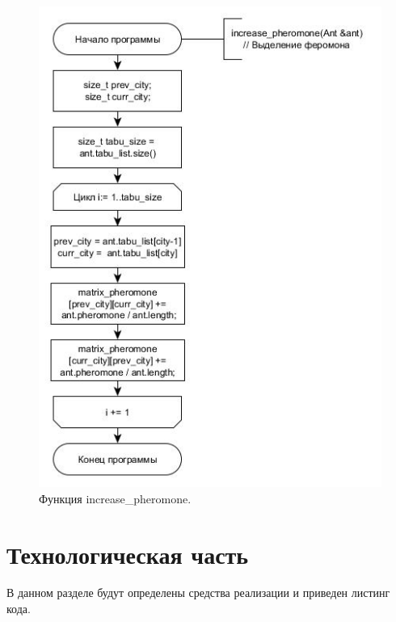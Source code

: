 \documentclass[a4paper, 14pt]{article}
\begin{document}
\begin{figure}[h!]
\center
\includegraphics[scale=0.8]{increase_pheromone.jpg}
\caption{Функция increase\_pheromone.}
\label{ris:increase_pheromone}
\end{figure}\newpage

	\newpage
	\section{Технологическая часть}
	\hspace{1cm}В данном разделе будут определены средства реализации и приведен листинг кода.
	
\end{document}
